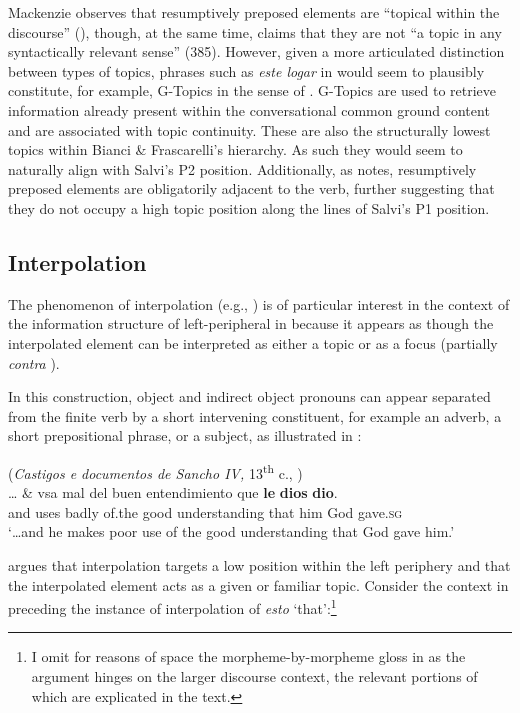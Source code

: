 \documentclass[output=paper]{LSP/langsci}
\begin{document}
Mackenzie observes that resumptively preposed elements are ``topical within the discourse'' (\citeyear[284]{Mackenzie2010}), though, at the same time, claims that they are not ``a topic in any syntactically relevant sense'' (385).  However, given a more articulated distinction between types of topics, phrases such as \textit{este logar} in  would seem to plausibly constitute, for example, G-Topics in the sense of \citet{BianciFrascarelli2010}.  G-Topics are used to retrieve information already present within the conversational common ground content and are associated with topic continuity.  These are also the structurally lowest topics within Bianci \& Frascarelli’s hierarchy.  As such they would seem to naturally align with Salvi’s P2 position.  Additionally, as \citet[392]{Mackenzie2010} notes, resumptively preposed elements are obligatorily adjacent to the verb, further suggesting that they do not occupy a high topic position along the lines of Salvi’s P1 position.

\subsection{Interpolation}\label{sec:poole:2.4}
The phenomenon of interpolation (e.g., \citealt{Chenery1905,BatlloriEtAl1995,Poole2013})  is of particular interest in the context of the information structure of left-peripheral  in  because it appears as though the interpolated element can be interpreted as either a topic or as a focus (partially \textit{contra} \citealt{Poole2013}).  

In this construction, object and indirect object pronouns can appear separated from the finite verb by a short intervening constituent, for example an adverb, a short prepositional phrase, or a subject, as illustrated in :\largerpage[2]

\ea%
    \label{ex:poole:5}
    (\textit{Castigos e documentos de Sancho IV,} 13\textsuperscript{th} c., \citealt[(4)]{Poole2013})\\
    \gll     … \& vsa mal del buen entendimiento que \textbf{le} \textbf{dios} \textbf{dio}. \\
	     {} and uses badly of.the good understanding that him God gave.\textsc{sg}\\
    \glt  ‘…and he makes poor use of the good understanding that God gave him.’
\z

\noindent \citet{Poole2013} argues that interpolation targets a low  position within the left periphery and that the interpolated element acts as a given or familiar topic.  Consider the context in  preceding the instance of interpolation of \textit{esto} ‘that’:\footnote{I omit for reasons of space the morpheme-by-morpheme gloss in  as the argument hinges on the larger discourse context, the relevant portions of which are explicated in the text.} 
\end{document}
